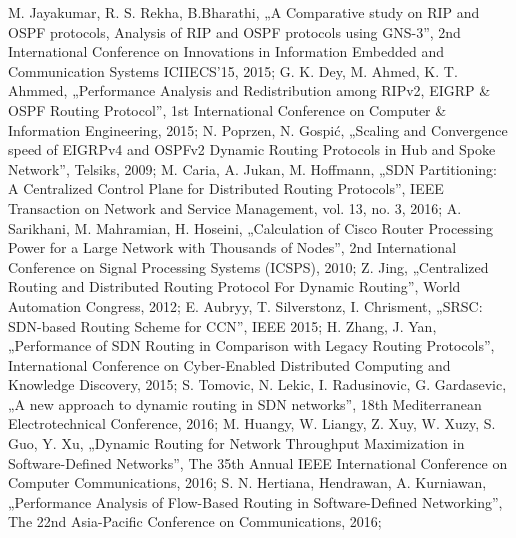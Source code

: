 \documentclass[conference,compsoc]{IEEEtran}
\begin{document}
\begin{thebibliography}{1}
M. Jayakumar, R. S. Rekha, B.Bharathi, „A Comparative study on RIP and OSPF protocols, Analysis of RIP and OSPF protocols using GNS-3”, 2nd International Conference on Innovations in Information Embedded and Communication Systems ICIIECS’15, 2015;
G. K. Dey, M. Ahmed, K. T. Ahmmed, „Performance Analysis and Redistribution among RIPv2, EIGRP \& OSPF Routing Protocol”, 1st International Conference on Computer \& Information Engineering, 2015;
N. Poprzen, N. Gospić, „Scaling and Convergence speed of EIGRPv4 and OSPFv2 Dynamic Routing Protocols in Hub and Spoke Network”, Telsiks, 2009;
M. Caria, A. Jukan, M. Hoffmann, „SDN Partitioning: A Centralized Control Plane for Distributed Routing Protocols”, IEEE Transaction on Network and Service Management, vol. 13, no. 3, 2016;
A. Sarikhani, M. Mahramian, H. Hoseini, „Calculation of Cisco Router Processing Power for a Large Network with Thousands of Nodes”, 2nd International Conference on Signal Processing Systems (ICSPS), 2010;
Z. Jing, „Centralized Routing and Distributed Routing Protocol For Dynamic Routing”, World Automation Congress, 2012;
E. Aubryy, T. Silverstonz, I. Chrisment, „SRSC: SDN-based Routing Scheme for CCN”, IEEE 2015;
H. Zhang, J. Yan, „Performance of SDN Routing in Comparison with Legacy Routing Protocols”, International Conference on Cyber-Enabled Distributed Computing and Knowledge Discovery, 2015;
S. Tomovic, N. Lekic, I. Radusinovic, G. Gardasevic, „A new approach to dynamic routing in SDN networks”, 18th Mediterranean Electrotechnical Conference, 2016;
M. Huangy, W. Liangy, Z. Xuy, W. Xuzy, S. Guo, Y. Xu, „Dynamic Routing for Network Throughput Maximization in Software-Defined Networks”, The 35th Annual IEEE International Conference on Computer Communications, 2016;
S. N. Hertiana, Hendrawan, A. Kurniawan, „Performance Analysis of Flow-Based Routing in Software-Defined Networking”, The 22nd Asia-Pacific Conference on Communications, 2016;


\end{thebibliography}




\end{document}
